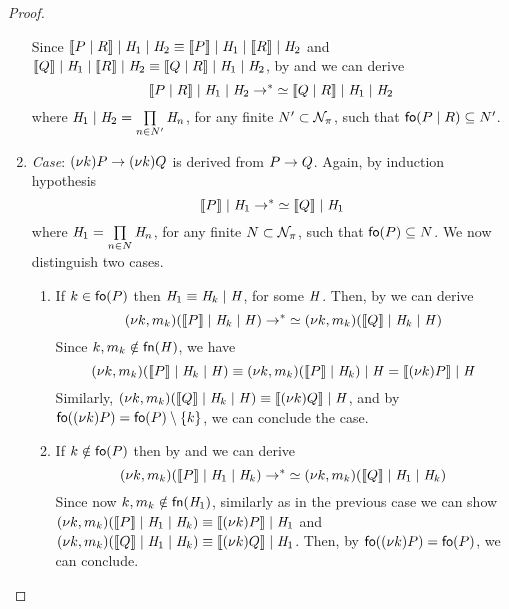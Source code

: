 \begin{proof}
\begin{enumerate}
Since $\llbracket P \;|\; R \rrbracket \;|\; \mathit{H}_1\;|\; \mathit{H}_2 
\equiv
\llbracket P \rrbracket\;|\; \mathit{H}_1 \;|\; \llbracket R \rrbracket \;|\; \mathit{H}_2$ and $\llbracket Q \rrbracket  \;|\; \mathit{H}_1  \;|\; \llbracket R \rrbracket  \;|\; \mathit{H}_2 \equiv \llbracket Q \;|\; R \rrbracket\;|\; \mathit{H}_1\;|\; \mathit{H}_2$, by  and  we can derive 
\[
\llbracket P \;|\; R \rrbracket \;|\; \mathit{H}_1\;|\; \mathit{H}_2  
\rightarrow\negthickspace^* \simeq
\llbracket Q \;|\; R \rrbracket\;|\; \mathit{H}_1\;|\; \mathit{H}_2
\]
where $\mathit{H}_1\;|\; \mathit{H}_2=\prod\limits_{n\in N'} \mathit{H}_{n}$, for any finite $N'\subset{\cal N}_\pi$, such that $\mathsf{fo}(P\;|\;R)\subseteq N'$.
%
%
\item \emph{Case}: $(\nu k) P \rightarrow (\nu k) Q$ is derived from $P\rightarrow Q$. Again, by induction hypothesis %
\[
\llbracket P \rrbracket\;|\; \mathit{H}_1 \rightarrow\negthickspace^* \simeq\llbracket Q \rrbracket\;|\; \mathit{H}_1
\]
where  
$\mathit{H}_1=\prod\limits_{n\in N} \mathit{H}_{n}$, for any finite $N\subset {\cal N}_\pi$, such that $\mathsf{fo}(P)\subseteq N$.
We now distinguish two cases.
	\begin{enumerate}
	\item If $k\in\mathsf{fo}(P)$ then %
	$\mathit{H}_1\equiv\mathit{H}_k\;|\; \mathit{H}$, for some $\mathit{H}$.
	Then, by  we can derive 
	\[
	(\nu k,m_k)(\llbracket P \rrbracket\;|\; \mathit{H}_k\;|\; \mathit{H} ) \rightarrow\negthickspace^* \simeq (\nu k, m_k)(\llbracket Q \rrbracket\;|\; \mathit{H}_k\;|\; \mathit{H}) 
	\]
	Since $k,m_k\notin\mathsf{fn}(\mathit{H})$, we have 
	\[
	(\nu k,m_k)(\llbracket P \rrbracket\;|\; \mathit{H}_k\;|\; \mathit{H} )\equiv(\nu k,m_k)(\llbracket P \rrbracket\;|\; \mathit{H}_k)\;|\; \mathit{H}=\llbracket (\nu k)P \rrbracket\;|\; \mathit{H}
	\] 
	Similarly, $(\nu k, m_k)(\llbracket Q \rrbracket\;|\; \mathit{H}_k\;|\; \mathit{H}) \equiv \llbracket (\nu k)Q \rrbracket\;|\; \mathit{H}$, and by $\mathsf{fo}((\nu k)P)=\mathsf{fo}(P)\setminus\{k\}$, we can conclude the case.
	\item If $k\notin\mathsf{fo}(P)$ then by  and  we can derive 
	\[
	(\nu k,m_k)(\llbracket P \rrbracket\;|\; \mathit{H}_1 \;|\; \mathit{H}_k) \rightarrow\negthickspace^*\simeq (\nu k, m_k)(\llbracket Q \rrbracket\;|\; \mathit{H}_1 \;|\; \mathit{H}_k)
	\]
	Since now $k,m_k\notin\mathsf{fn}(\mathit{H}_1)$, similarly as in the previous case we can show 
	$(\nu k,m_k)(\llbracket P \rrbracket\;|\; \mathit{H}_1 \;|\; \mathit{H}_k) \equiv \llbracket (\nu k)P \rrbracket\;|\; \mathit{H}_1$ and $(\nu k, m_k)(\llbracket Q \rrbracket\;|\; \mathit{H}_1 \;|\; \mathit{H}_k)\equiv \llbracket (\nu k)Q \rrbracket \;|\; \mathit{H}_1$. 
	Then, by $\mathsf{fo}((\nu k)P)=\mathsf{fo}(P)$, we can conclude.
	\end{enumerate}

\end{enumerate}
\end{proof}
